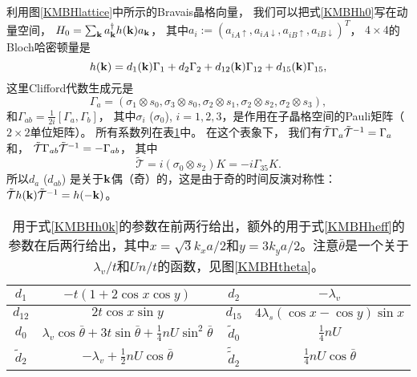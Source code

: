 利用图\ref{KMBHlattice}中所示的Bravais晶格向量，
我们可以把式\eqref{KMBHh0}写在动量空间，
$H_0=\sum_{\vb k}a^\dagger_{\vb k}h(\vb k) a_{\vb k}$，
其中$a_i := (a_{iA\uparrow},a_{iA\downarrow},a_{iB\uparrow},a_{iB\downarrow})^T$，
$4\times 4$的Bloch哈密顿量是
\begin{equation}\label{KMBHh0k}
	h(\vb k)=d_1(\vb k)\Gamma_1+d_2 \Gamma_2+d_{12}(\vb k)\Gamma_{12}+d_{15}(\vb k)\Gamma_{15},
\end{equation}
这里Clifford代数生成元是
\begin{equation}
	\Gamma_a=(\sigma_1 \otimes s_0,\sigma_3 \otimes s_0,\sigma_2\otimes s_1, \sigma_2\otimes s_2,\sigma_2\otimes s_3),\label{gammaKMBH}
\end{equation}
和$\Gamma_{ab}=\frac{1}{2i}[\Gamma_a,\Gamma_b]$，
其中$\sigma_i$ ($\sigma_0$), $i=1,2,3$，是作用在子晶格空间的Pauli矩阵（$2\times 2$单位矩阵）。
所有系数列在表\ref{paramtab}中。
在这个表象下，
我们有$\tilde{\mathcal T} \Gamma_a \tilde{\mathcal T}^{-1} =\Gamma_a$和，
$\tilde{\mathcal T} \Gamma_{ab} \tilde{\mathcal T}^{-1} =-\Gamma_{ab}$，
其中
\begin{equation}
	\tilde{\mathcal T}=i(\sigma_0\otimes s_2) K = -i\Gamma_{35}K.\label{PTRSop1}
\end{equation}
所以$d_{a}$ ($d_{ab}$) 是关于$\vb k$偶（奇）的，这是由于奇的时间反演对称性：$\tilde{\mathcal T}h(\vb k)\tilde{\mathcal T}^{-1} = h(-\vb k)$。




\begin{table}[htb]
    \centering
	\caption{用于式\eqref{KMBHh0k}的参数在前两行给出，额外的用于式\eqref{KMBHheff}的参数在后两行给出，其中$x=\sqrt{3} k_x a/2$和$y=3 k_y a/2$。注意$\bar \theta$是一个关于$\lambda_v/t$和$Un/t$的函数，见图\ref{KMBHtheta}。}
   \label{paramtab}
	\begin{tabular}{cc|cc}
	\hline
		$d_1$ & $-t(1+2\cos x\cos y)$ & $d_2$ & $-\lambda_v$ \\
		\hline
		$d_{12}$ & $2t\cos x\sin y$ & $d_{15}$ & $4\lambda_s(\cos x-\cos y)\sin x$\\
		\hline
		$d_0$ & $\lambda_v\cos \bar \theta+3t\sin \bar \theta+\frac{1}{4}nU\sin^2 \bar \theta$ & $\tilde d_0$ & $\frac{1}{4}nU$ \\
		\hline
		$\tilde d_2$ & $-\lambda_v+\frac{1}{2}nU \cos \bar \theta$ & $\tilde{\tilde{d}}_2$ & $\frac{1}{4}nU \cos \bar \theta$\\
		\hline
	\end{tabular}
\end{table}


